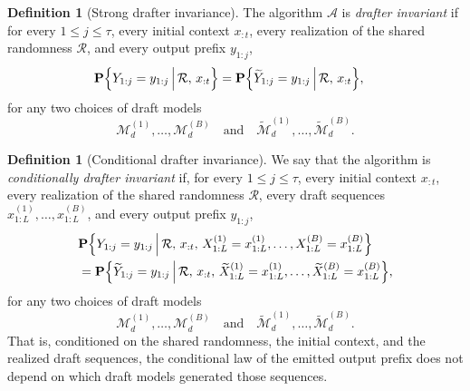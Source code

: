 \documentclass{article}
\theoremstyle{plain}
\theoremstyle{definition}
\newtheorem{definition}[theorem]{Definition}
\begin{document}
\begin{definition}[Strong drafter invariance]
\label{def:drafter_invariance}
The algorithm $\mathcal{A}$ is \emph{drafter invariant} if for every $1\le j\le \tau$,
every initial context $x_{:t}$, every realization of the shared randomness $\mathcal{R}$,
and every output prefix $y_{1:j}$,
\begin{align*}
&\mathbf{P}\Bigl\{
Y_{1:j}=y_{1:j}\,\Big|\,\mathcal{R},\,x_{:t}
\Bigr\} =
\mathbf{P}\Bigl\{
\widetilde{Y}_{1:j}=y_{1:j}\,\Big|\,\mathcal{R},\,x_{:t}
\Bigr\},
\end{align*}
for any two choices of draft models
\[
\mathcal{M}_d^{(1)},\ldots,\mathcal{M}_d^{(B)}
\quad\text{and}\quad
\widetilde{\mathcal{M}}_d^{(1)},\ldots,\widetilde{\mathcal{M}}_d^{(B)}. 
\]
\end{definition}


\begin{definition}[Conditional drafter invariance]
\label{def:conditional_drafter_invariance}
We say that the algorithm is \emph{conditionally drafter invariant} if, for every $1\le j\le \tau$,
every initial context $x_{:t}$, every realization of the shared randomness $\mathcal{R}$,
every draft sequences $x_{1:L}^{(1)},\ldots,x_{1:L}^{(B)}$, and every output prefix $y_{1:j}$,
\begin{align*}
&\mathbf{P}\Bigl\{
Y_{1:j}=y_{1:j}\,\Big|\,
\mathcal{R},\,x_{:t},\,
X_{1:L}^{(1)}=x_{1:L}^{(1)},\ldots,
X_{1:L}^{(B)}=x_{1:L}^{(B)}
\Bigr\} \\
&=
\mathbf{P}\Bigl\{
\widetilde{Y}_{1:j}=y_{1:j}\,\Big|\,
\mathcal{R},\,x_{:t},\,
\widetilde{X}_{1:L}^{(1)}=x_{1:L}^{(1)},\ldots,
\widetilde{X}_{1:L}^{(B)}=x_{1:L}^{(B)}
\Bigr\},
\end{align*}
for any two choices of draft models
\[
\mathcal{M}_d^{(1)},\ldots,\mathcal{M}_d^{(B)}
\quad\text{and}\quad
\widetilde{\mathcal{M}}_d^{(1)},\ldots,\widetilde{\mathcal{M}}_d^{(B)}.
\]
That is, conditioned on the shared randomness, the initial context, and the realized draft sequences, the conditional law of the emitted output prefix does not depend on which draft models generated those sequences.
\end{definition}
\end{document}
